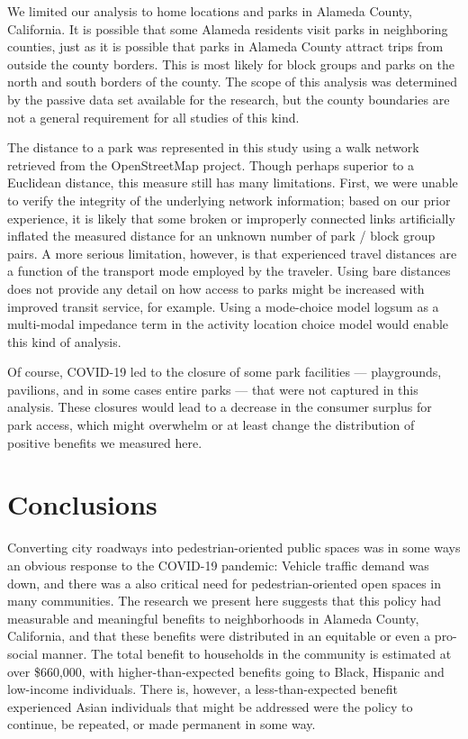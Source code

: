 \documentclass[3p, authoryear, review]{elsarticle} %
\begin{document}
We limited our analysis to home locations and parks in Alameda County,
California. It is possible that some Alameda residents visit parks in
neighboring counties, just as it is possible that parks in Alameda County
attract trips from outside the county borders. This is most likely for block
groups and parks on the north and south borders of the county. The scope of this
analysis was determined by the passive data set available for the research, but
the county boundaries are not a general requirement for all studies of this kind.

The distance to a park was represented in this study using a walk network retrieved
from the OpenStreetMap project. Though perhaps superior to a Euclidean distance,
this measure still has many limitations. First, we were unable to verify the
integrity of the underlying network information; based on our prior experience,
it is likely that some broken or improperly connected links artificially
inflated the measured distance for an unknown number of park / block group
pairs. A more serious limitation, however, is that experienced travel distances
are a function of the transport mode employed by the traveler. Using bare
distances does not provide any detail on how access to parks might be increased
with improved transit service, for example. Using a mode-choice model logsum
as a multi-modal impedance term in the activity location choice model would
enable this kind of analysis.

Of course, COVID-19 led to the closure of some park facilities --- playgrounds,
pavilions, and in some cases entire parks --- that were not
captured in this analysis. These closures would lead to a decrease in the consumer
surplus for park access, which might overwhelm or at least change the distribution
of positive benefits we measured here.

\hypertarget{conclusions}{%
\section{Conclusions}\label{conclusions}}

Converting city roadways into pedestrian-oriented public spaces was in some
ways an obvious response to the COVID-19 pandemic: Vehicle traffic demand was
down, and there was a also critical need for pedestrian-oriented open spaces in
many communities. The research we present here suggests that this policy had
measurable and meaningful benefits to neighborhoods in Alameda County, California,
and that these benefits were distributed in an equitable or even a pro-social
manner. The total benefit to households in the community is estimated at over \$660,000,
with higher-than-expected benefits going to Black, Hispanic and low-income
individuals. There is, however, a less-than-expected benefit experienced
Asian individuals that might be addressed were the policy to continue, be repeated,
or made permanent in some way.
\end{document}
